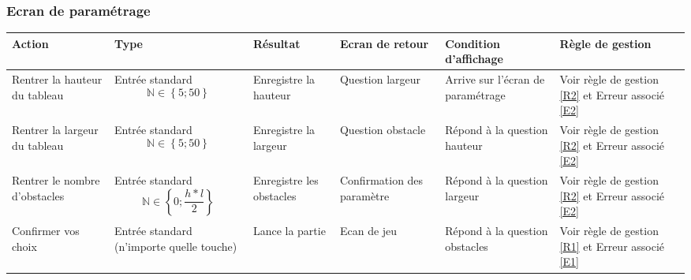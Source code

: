 \documentclass[12pt,a4paper]{article}
\begin{document}
				\subsubsection{Ecran de paramétrage}
						\hspace{-3cm}
						\begin{tabular}{|p{3cm}|p{2.5cm}|p{3cm}|p{2.5cm}|p{3cm}|p{2cm}|} %
							\hline
							Action                        & Type                            				       & Résultat              	& Ecran de retour   		& Condition d'affichage 			& Règle de gestion \\
							\hline \hline
							Rentrer la hauteur du tableau & Entrée standard $$\mathbb{N} \in \left\{5;50\right\}$$  & Enregistre la hauteur 	& Question largeur  		& Arrive sur l'écran de paramétrage	& Voir règle de gestion	\ref{R2} et Erreur associé \ref{E2}\\
							\hline
							Rentrer la largeur du tableau & Entrée standard $$\mathbb{N} \in \left\{5;50\right\}$$  & Enregistre la largeur 	& Question obstacle 		& Répond à la question hauteur      & Voir règle de gestion \ref{R2} et Erreur associé \ref{E2}\\
							\hline
							Rentrer le nombre d'obstacles  & Entrée standard $$\mathbb{N} \in \left\{0;\frac{h*l}{2}\right\}$$  & Enregistre les obstacles  & Confirmation des paramètre& Répond à la question largeur & Voir règle de gestion \ref{R2} et Erreur associé \ref{E2}		\\
							\hline
							Confirmer vos choix 		  & Entrée standard (n'importe quelle touche)			   & Lance la partie		& Ecan de jeu				& Répond à la question obstacles	& Voir règle de gestion \ref{R1}	et Erreur associé \ref{E1}			\\
							\hline
						\end{tabular}
						\label{Action possible sur l'écran de paramétrage}
\end{document}
